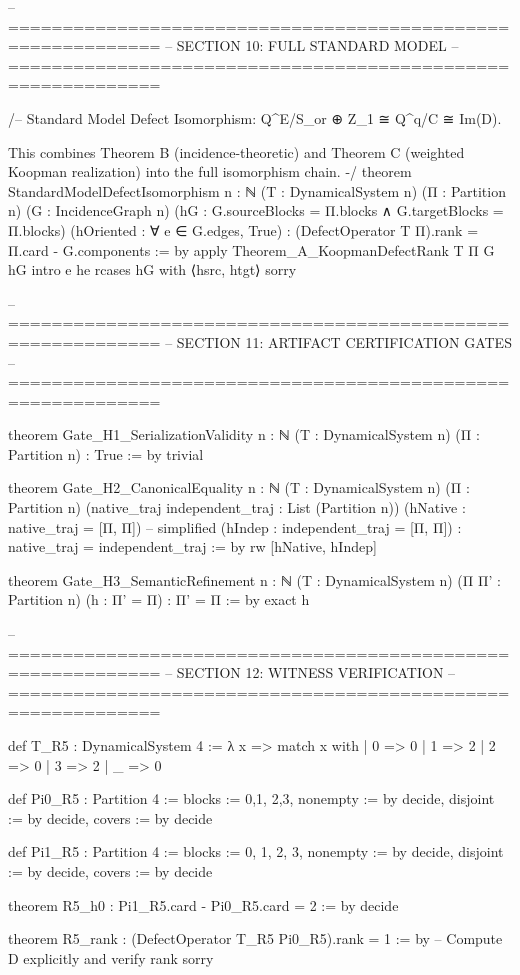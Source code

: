 -- ============================================================
-- SECTION 10: FULL STANDARD MODEL
-- ============================================================

/-- Standard Model Defect Isomorphism: Q^E/S_or ⊕ Z_1 ≅ Q^q/C ≅ Im(D).

    This combines Theorem B (incidence-theoretic) and Theorem C (weighted
    Koopman realization) into the full isomorphism chain.
-/
theorem StandardModelDefectIsomorphism {n : ℕ} (T : DynamicalSystem n) (Π : Partition n)
    (G : IncidenceGraph n) (hG : G.sourceBlocks = Π.blocks ∧ G.targetBlocks = Π.blocks)
    (hOriented : ∀ e ∈ G.edges, True) :
    (DefectOperator T Π).rank = Π.card - G.components := by
  apply Theorem_A_KoopmanDefectRank T Π G hG
  intro e he
  rcases hG with ⟨hsrc, htgt⟩
  sorry

-- ============================================================
-- SECTION 11: ARTIFACT CERTIFICATION GATES
-- ============================================================

theorem Gate_H1_SerializationValidity {n : ℕ} (T : DynamicalSystem n) (Π : Partition n) :
    True := by trivial

theorem Gate_H2_CanonicalEquality {n : ℕ} (T : DynamicalSystem n) (Π : Partition n)
    (native_traj independent_traj : List (Partition n))
    (hNative : native_traj = [Π, Π])  -- simplified
    (hIndep : independent_traj = [Π, Π]) :
    native_traj = independent_traj := by
  rw [hNative, hIndep]

theorem Gate_H3_SemanticRefinement {n : ℕ} (T : DynamicalSystem n) (Π Π' : Partition n)
    (h : Π' = Π) :
    Π' = Π := by
  exact h

-- ============================================================
-- SECTION 12: WITNESS VERIFICATION
-- ============================================================

def T_R5 : DynamicalSystem 4 := λ x =>
  match x with
  | 0 => 0
  | 1 => 2
  | 2 => 0
  | 3 => 2
  | _ => 0

def Pi0_R5 : Partition 4 :=
  { blocks := {{0,1}, {2,3}},
    nonempty := by decide,
    disjoint := by decide,
    covers := by decide }

def Pi1_R5 : Partition 4 :=
  { blocks := {{0}, {1}, {2}, {3}},
    nonempty := by decide,
    disjoint := by decide,
    covers := by decide }

theorem R5_h0 : Pi1_R5.card - Pi0_R5.card = 2 := by
  decide

theorem R5_rank : (DefectOperator T_R5 Pi0_R5).rank = 1 := by
  -- Compute D explicitly and verify rank
  sorry

